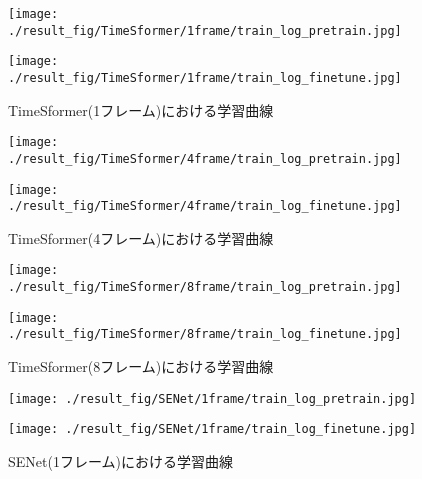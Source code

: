 \begin{figure}[htbp]
  \begin{minipage}[b]{0.5\linewidth}
    \centering
    \texttt{[image: ./result\_fig/TimeSformer/1frame/train\_log\_pretrain.jpg]}
  \end{minipage}
  \begin{minipage}[b]{0.5\linewidth}
    \centering
    \texttt{[image: ./result\_fig/TimeSformer/1frame/train\_log\_finetune.jpg]}
  \end{minipage}
  \caption{TimeSformer(1フレーム)における学習曲線}\label{fig:TimeSformer_1frame}
\end{figure}

\begin{figure}[htbp]
  \begin{minipage}[b]{0.5\linewidth}
    \centering
    \texttt{[image: ./result\_fig/TimeSformer/4frame/train\_log\_pretrain.jpg]}
  \end{minipage}
  \begin{minipage}[b]{0.5\linewidth}
    \centering
    \texttt{[image: ./result\_fig/TimeSformer/4frame/train\_log\_finetune.jpg]}
  \end{minipage}
  \caption{TimeSformer(4フレーム)における学習曲線}
\end{figure}

\begin{figure}[htbp]
  \begin{minipage}[b]{0.5\linewidth}
    \centering
    \texttt{[image: ./result\_fig/TimeSformer/8frame/train\_log\_pretrain.jpg]}
  \end{minipage}
  \begin{minipage}[b]{0.5\linewidth}
    \centering
    \texttt{[image: ./result\_fig/TimeSformer/8frame/train\_log\_finetune.jpg]}
  \end{minipage}
  \caption{TimeSformer(8フレーム)における学習曲線}
\end{figure}

\begin{figure}[htbp]
  \begin{minipage}[b]{0.5\linewidth}
    \centering
    \texttt{[image: ./result\_fig/SENet/1frame/train\_log\_pretrain.jpg]}
  \end{minipage}
  \begin{minipage}[b]{0.5\linewidth}
    \centering
    \texttt{[image: ./result\_fig/SENet/1frame/train\_log\_finetune.jpg]}
  \end{minipage}
  \caption{SENet(1フレーム)における学習曲線}
\end{figure}

